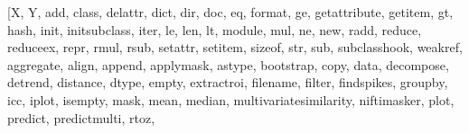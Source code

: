 \documentclass[letterpaper,10pt,english]{sphinxmanual}
\begin{document}
\begin{sphinxVerbatim}[commandchars=\\\{\}]
[\PYGZsq{}X\PYGZsq{}, \PYGZsq{}Y\PYGZsq{}, \PYGZsq{}\PYGZus{}\PYGZus{}add\PYGZus{}\PYGZus{}\PYGZsq{}, \PYGZsq{}\PYGZus{}\PYGZus{}class\PYGZus{}\PYGZus{}\PYGZsq{}, \PYGZsq{}\PYGZus{}\PYGZus{}delattr\PYGZus{}\PYGZus{}\PYGZsq{}, \PYGZsq{}\PYGZus{}\PYGZus{}dict\PYGZus{}\PYGZus{}\PYGZsq{}, \PYGZsq{}\PYGZus{}\PYGZus{}dir\PYGZus{}\PYGZus{}\PYGZsq{}, \PYGZsq{}\PYGZus{}\PYGZus{}doc\PYGZus{}\PYGZus{}\PYGZsq{}, \PYGZsq{}\PYGZus{}\PYGZus{}eq\PYGZus{}\PYGZus{}\PYGZsq{}, \PYGZsq{}\PYGZus{}\PYGZus{}format\PYGZus{}\PYGZus{}\PYGZsq{}, \PYGZsq{}\PYGZus{}\PYGZus{}ge\PYGZus{}\PYGZus{}\PYGZsq{}, \PYGZsq{}\PYGZus{}\PYGZus{}getattribute\PYGZus{}\PYGZus{}\PYGZsq{}, \PYGZsq{}\PYGZus{}\PYGZus{}getitem\PYGZus{}\PYGZus{}\PYGZsq{}, \PYGZsq{}\PYGZus{}\PYGZus{}gt\PYGZus{}\PYGZus{}\PYGZsq{}, \PYGZsq{}\PYGZus{}\PYGZus{}hash\PYGZus{}\PYGZus{}\PYGZsq{}, \PYGZsq{}\PYGZus{}\PYGZus{}init\PYGZus{}\PYGZus{}\PYGZsq{}, \PYGZsq{}\PYGZus{}\PYGZus{}init\PYGZus{}subclass\PYGZus{}\PYGZus{}\PYGZsq{}, \PYGZsq{}\PYGZus{}\PYGZus{}iter\PYGZus{}\PYGZus{}\PYGZsq{}, \PYGZsq{}\PYGZus{}\PYGZus{}le\PYGZus{}\PYGZus{}\PYGZsq{}, \PYGZsq{}\PYGZus{}\PYGZus{}len\PYGZus{}\PYGZus{}\PYGZsq{}, \PYGZsq{}\PYGZus{}\PYGZus{}lt\PYGZus{}\PYGZus{}\PYGZsq{}, \PYGZsq{}\PYGZus{}\PYGZus{}module\PYGZus{}\PYGZus{}\PYGZsq{}, \PYGZsq{}\PYGZus{}\PYGZus{}mul\PYGZus{}\PYGZus{}\PYGZsq{}, \PYGZsq{}\PYGZus{}\PYGZus{}ne\PYGZus{}\PYGZus{}\PYGZsq{}, \PYGZsq{}\PYGZus{}\PYGZus{}new\PYGZus{}\PYGZus{}\PYGZsq{}, \PYGZsq{}\PYGZus{}\PYGZus{}radd\PYGZus{}\PYGZus{}\PYGZsq{}, \PYGZsq{}\PYGZus{}\PYGZus{}reduce\PYGZus{}\PYGZus{}\PYGZsq{}, \PYGZsq{}\PYGZus{}\PYGZus{}reduce\PYGZus{}ex\PYGZus{}\PYGZus{}\PYGZsq{}, \PYGZsq{}\PYGZus{}\PYGZus{}repr\PYGZus{}\PYGZus{}\PYGZsq{}, \PYGZsq{}\PYGZus{}\PYGZus{}rmul\PYGZus{}\PYGZus{}\PYGZsq{}, \PYGZsq{}\PYGZus{}\PYGZus{}rsub\PYGZus{}\PYGZus{}\PYGZsq{}, \PYGZsq{}\PYGZus{}\PYGZus{}setattr\PYGZus{}\PYGZus{}\PYGZsq{}, \PYGZsq{}\PYGZus{}\PYGZus{}setitem\PYGZus{}\PYGZus{}\PYGZsq{}, \PYGZsq{}\PYGZus{}\PYGZus{}sizeof\PYGZus{}\PYGZus{}\PYGZsq{}, \PYGZsq{}\PYGZus{}\PYGZus{}str\PYGZus{}\PYGZus{}\PYGZsq{}, \PYGZsq{}\PYGZus{}\PYGZus{}sub\PYGZus{}\PYGZus{}\PYGZsq{}, \PYGZsq{}\PYGZus{}\PYGZus{}subclasshook\PYGZus{}\PYGZus{}\PYGZsq{}, \PYGZsq{}\PYGZus{}\PYGZus{}weakref\PYGZus{}\PYGZus{}\PYGZsq{}, \PYGZsq{}aggregate\PYGZsq{}, \PYGZsq{}align\PYGZsq{}, \PYGZsq{}append\PYGZsq{}, \PYGZsq{}apply\PYGZus{}mask\PYGZsq{}, \PYGZsq{}astype\PYGZsq{}, \PYGZsq{}bootstrap\PYGZsq{}, \PYGZsq{}copy\PYGZsq{}, \PYGZsq{}data\PYGZsq{}, \PYGZsq{}decompose\PYGZsq{}, \PYGZsq{}detrend\PYGZsq{}, \PYGZsq{}distance\PYGZsq{}, \PYGZsq{}dtype\PYGZsq{}, \PYGZsq{}empty\PYGZsq{}, \PYGZsq{}extract\PYGZus{}roi\PYGZsq{}, \PYGZsq{}file\PYGZus{}name\PYGZsq{}, \PYGZsq{}filter\PYGZsq{}, \PYGZsq{}find\PYGZus{}spikes\PYGZsq{}, \PYGZsq{}groupby\PYGZsq{}, \PYGZsq{}icc\PYGZsq{}, \PYGZsq{}iplot\PYGZsq{}, \PYGZsq{}isempty\PYGZsq{}, \PYGZsq{}mask\PYGZsq{}, \PYGZsq{}mean\PYGZsq{}, \PYGZsq{}median\PYGZsq{}, \PYGZsq{}multivariate\PYGZus{}similarity\PYGZsq{}, \PYGZsq{}nifti\PYGZus{}masker\PYGZsq{}, \PYGZsq{}plot\PYGZsq{}, \PYGZsq{}predict\PYGZsq{}, \PYGZsq{}predict\PYGZus{}multi\PYGZsq{}, \PYGZsq{}r\PYGZus{}to\PYGZus{}z\PYGZsq{}, 
\end{sphinxVerbatim}
\end{document}
